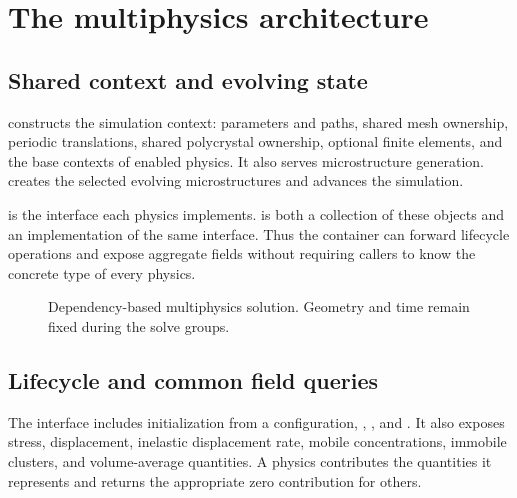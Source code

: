 \chapter{The multiphysics architecture}\label{chap:multiphysics}
\section{Shared context and evolving state}
 constructs the simulation context: parameters and paths, shared mesh ownership, periodic translations, shared polycrystal ownership, optional finite elements, and the base contexts of enabled physics. It also serves microstructure generation.  creates the selected evolving microstructures and advances the simulation.

 is the interface each physics implements.  is both a collection of these objects and an implementation of the same interface. Thus the container can forward lifecycle operations and expose aggregate fields without requiring callers to know the concrete type of every physics.
\begin{figure}[htbp]
\centering
{}
\caption{Dependency-based multiphysics solution. Geometry and time remain fixed during the solve groups.}
\end{figure}

\section{Lifecycle and common field queries}
The interface includes initialization from a configuration, , ,  and . It also exposes stress, displacement, inelastic displacement rate, mobile concentrations, immobile clusters, and volume-average quantities. A physics contributes the quantities it represents and returns the appropriate zero contribution for others.

